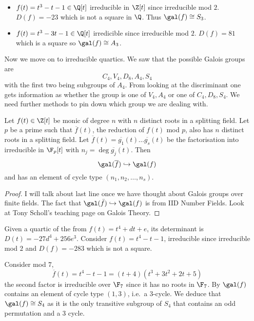 \documentclass[a4paper]{article}
\newcommand*{\red}[1]{\overline{#1}}
\begin{document}
\begin{eg}\leavevmode
  \begin{itemize}
  \item \(f(t) = t^3 - t - 1 \in \Q[t]\) irreducible in \(\Z[t]\) since irreducible mod \(2\). \(D(f) = -23\) which is not a square in \(\Q\). Thus \(\gal(f) \cong S_3\).
  \item \(f(t) = t^3 - 3t - 1 \in \Q[t]\) irredicible since irreducible mod \(2\). \(D(f) = 81\) which is a square so \(\gal(f) \cong A_3\).
  \end{itemize}
\end{eg}

Now we move on to irreducible quartics. We saw that the possible Galois groups are
\[
  C_4, V_4, D_8, A_4, S_4
\]
with the first two being subgroups of \(A_4\). From looking at the discriminant one gets information as whether the group is one of \(V_4, A_4\) or one of \(C_4, D_8, S_4\). We need further methods to pin down which group we are dealing with.

\begin{theorem}
  \label{thm:mod p reduction}
  Let \(f(t) \in \Z[t]\) be monic of degree \(n\) with \(n\) distinct roots in a splitting field. Let \(p\) be a prime such that \(\red f(t)\), the reduction of \(f(t)\) mod \(p\), also has \(n\) distinct roots in a splitting field. Let \(\red f(t) = \red{g_1}(t) \dots \red{g_s}(t)\) be the factorisation into irreducible in \(\F_p[t]\) with \(n_j =  \deg \red{g_j}(t)\). Then
  \[
    \gal(\red f) \hookrightarrow \gal(f)
  \]
  and has an element of cycle type \((n_1, n_2, \dots, n_s)\).
\end{theorem}

\begin{proof}
  I will talk about last line once we have thought about Galois groups over finite fields. The fact that \(\gal(\bar f) \hookrightarrow \gal(f)\) is from IID Number Fields. Look at Tony Scholl's teaching page on Galois Theory.
\end{proof}

\begin{eg}
  Given a quartic of the from \(f(t) = t^4 + dt + e\), its determinant is \(D(t) = -27d^4 + 256e^3\). Consider \(f(t) = t^4 - t -1\), irreducible since irreducible mod \(2\) and \(D(f) = -283\) which is not a square.

  Consider mod \(7\),
  \[
    \red f(t) = t^4 - t - 1 = (t + 4)(t^3 + 3t^2 + 2t + 5)
  \]
  the second factor is irreducible over \(\F_7\) since it has no roots in \(\F_7\). By  \(\gal(f)\) contains an element of cycle type \((1, 3)\), i.e.\ a \(3\)-cycle. We deduce that \(\gal(f) \cong S_4\) as it is the only transitive subgroup of \(S_4\) that contains an odd permutation and a \(3\) cycle.
\end{eg}
\end{document}
